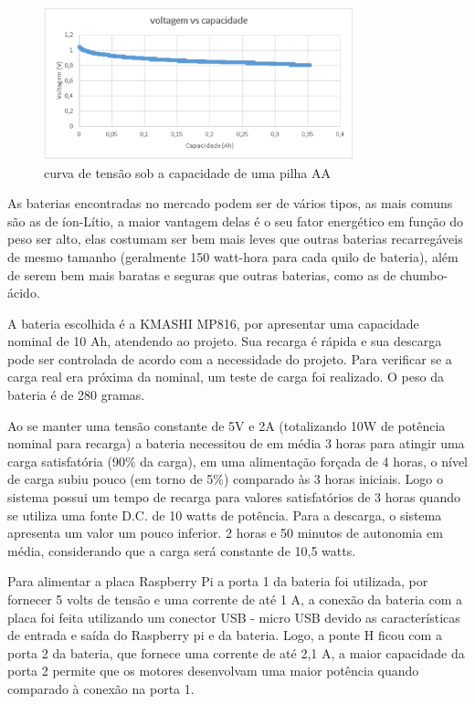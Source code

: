 \begin{figure}[H]
    \centering
    \includegraphics[width=0.8\textwidth]{figuras/volt_vs_cap.eps}
    \caption{curva de tensão sob a capacidade de uma pilha AA}
    \label{fig:volts}
\end{figure}

As baterias encontradas no mercado podem ser de vários tipos, as mais comuns são as de íon-Lítio, a maior vantagem delas é o seu fator
energético em função do peso ser alto, elas costumam ser bem mais leves que outras baterias recarregáveis de mesmo tamanho (geralmente
150 watt-hora para cada quilo de bateria), além de serem bem mais baratas e seguras que outras baterias, como as de chumbo-ácido.

A bateria escolhida é a KMASHI MP816, por apresentar uma capacidade nominal de 10 Ah, atendendo ao projeto. Sua recarga é rápida e sua 
descarga pode ser controlada de acordo com a necessidade do projeto.  Para verificar se a carga real era próxima da nominal, um teste
de carga foi realizado. O peso da bateria é de 280 gramas.

Ao se manter uma tensão constante de 5V e 2A (totalizando 10W de potência nominal para recarga) a bateria necessitou de em média 3 horas
para atingir uma carga satisfatória (90\% da carga), em uma alimentação forçada de 4 horas, o nível de carga subiu pouco (em torno de 5\%)
comparado às 3 horas iniciais. Logo o sistema possui um tempo de recarga para valores satisfatórios de 3 horas quando se utiliza uma fonte
D.C. de 10 watts de potência. Para a descarga, o sistema apresenta um valor um pouco inferior. 2 horas e 50 minutos de autonomia em média,
considerando que a carga será constante de 10,5 watts.

Para alimentar a placa Raspberry Pi a porta 1 da bateria foi utilizada, por fornecer 5 volts de tensão e uma corrente de até 1 A, a
conexão da bateria com a placa foi feita utilizando um conector USB - micro USB devido as características de entrada e saída do Raspberry
pi e da bateria. Logo, a ponte H ficou com a porta 2 da bateria, que fornece uma corrente de até 2,1 A, a maior capacidade da porta 2
permite que os motores desenvolvam uma maior potência quando comparado à conexão na porta 1.

